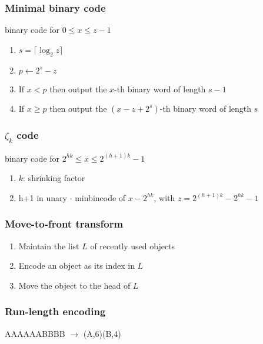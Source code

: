 \begin{frame}[fragile]
\frametitle{Minimal binary code}
\begin{block}{binary code for \(0\le x\le z-1\)}
\begin{enumerate}
\item
\(s = \lceil \log_{2}z \rceil\)
\item
      \(p \gets 2^{s}-z\)
\item
      If \(x < p\) then output the \(x\)-th binary word of length \(s-1\)
\item
      If \(x \ge p\) then output the \((x-z+2^{s})\)-th binary word of length \(s\)
\end{enumerate}
\end{block}
\end{frame}

\begin{frame}[fragile]
\frametitle{\(\zeta_{k}\) code}
\begin{block}{binary code for \(2^{hk}\le x\le 2^{(h+1)k}-1\)}
\begin{enumerate}
\item
      \(k\): shrinking factor
\item
      h+1 in unary \(\cdot\) minbincode of \(x - 2^{hk}\), with
\(z = 2^{(h+1)k} - 2^{hk} -1\)
\end{enumerate}
\end{block}
\end{frame}

\begin{frame}[fragile]
\frametitle{Move-to-front transform}

\begin{enumerate}
\item
      Maintain the list \(L\) of recently used objects
\item
      Encode an object as its index in \(L\)
\item
      Move the object to the head of \(L\)
\end{enumerate}
\end{frame}



\begin{frame}[fragile]
\frametitle{Run-length encoding}

AAAAAABBBB \(\rightarrow\) (A,6)(B,4)

\end{frame}

